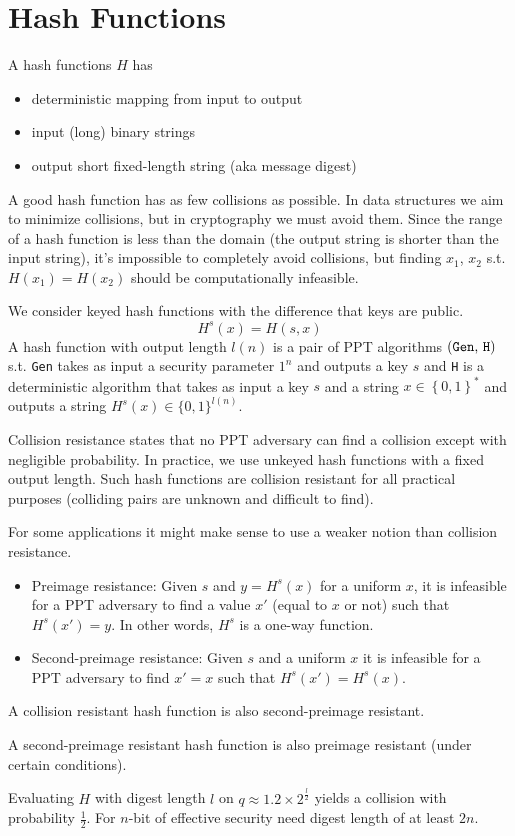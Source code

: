 \section{Hash Functions}

A hash functions $H$ has
\begin{itemize}
    \item deterministic mapping from input to output
    \item input (long) binary strings
    \item output short fixed-length string (aka message digest)
\end{itemize}

A good hash function has as few collisions as 
possible. In data structures we aim to minimize 
collisions, but in cryptography we must avoid 
them. Since the range of a hash function is 
less than the domain (the output string is 
shorter than the input string), it's 
impossible to completely avoid collisions, 
but finding $x_1$, $x_2$ s.t. $H(x_1) = H(x_2)$
should be computationally infeasible. 

We consider keyed hash functions with the difference 
that keys are public. 
\begin{equation}
    H^s(x) = H(s,x)
\end{equation}
A hash function with output length $l(n)$ is a pair 
of PPT algorithms $(\text{\texttt{Gen}, \texttt{H}})$
s.t. \texttt{Gen} takes as input a security parameter $1^n$ 
and outputs a key $s$ and \texttt{H} is a deterministic
algorithm that takes as input a key $s$ and a string 
$x \in \left\{0,1\right\}^*$ and outputs a string 
$H^s(x) \in \{0,1\}^{l(n)}$. 

Collision resistance states that no PPT adversary can find a collision except with
negligible probability.
In practice, we use unkeyed hash functions with a fixed 
output length. Such hash functions are collision resistant 
for all practical purposes (colliding pairs are unknown and 
difficult to find). 

For some applications it might make sense to use a weaker notion than collision
resistance.
\begin{itemize}
    \item Preimage resistance: Given $s$ and $y = H^s(x)$ 
    for a uniform $x$, it is infeasible for a
        PPT adversary to find a value $x'$ 
        (equal to $x$ or not) such that $H^s(x') = y$. 
        In other words, $H^s$ is a one-way function.
    \item Second-preimage resistance: 
    Given $s$ and a uniform $x$ it is infeasible 
    for a PPT adversary to find $x' = x$ such that 
    $H^s(x') = H^s(x)$.
\end{itemize}

A collision resistant hash function is also 
second-preimage resistant.

A second-preimage resistant hash function is also preimage resistant (under certain
conditions).

Evaluating $H$ with digest length $l$ on 
$q \approx 1.2 \times 2^{\frac{l}{2}}$ yields a 
collision with probability $\frac{1}{2}$. 
For $n$-bit of effective security need digest length of 
at least $2n$. 